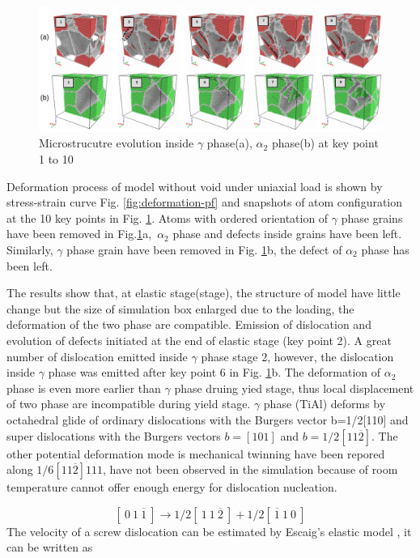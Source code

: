 \documentclass[metals,article,submit,moreauthors,pdftex,10pt,a4paper]{Definitions/mdpi}
\begin{document}
\begin{figure}[ht] 
	\centering
	\includegraphics[width=1\linewidth]{img/def2}
	\caption{Microstrucutre evolution inside $\gamma$ phase(a), $\alpha_2$ phase(b) at key point 1 to 10}
	\label{fig:Defect}
\end{figure}

Deformation process of model without void under uniaxial load is shown by stress-strain curve Fig. \ref{fig:deformation-pf} and snapshots of atom configuration at the 10 key points in Fig. \ref{fig:Defect}.  Atoms with ordered orientation  of $\gamma$ phase grains have been removed in Fig.\ref{fig:Defect}a,\ $\alpha_2$ phase and defects inside grains have been left. Similarly, $\gamma$ phase grain have been removed in Fig. \ref{fig:Defect}b, the defect of $\alpha_2$ phase has been left.  


The results show that, at elastic stage(stage\uppercase\expandafter{}), the structure of model have little change but the size of simulation box enlarged due to the loading, the deformation of the two phase are compatible. Emission of dislocation and evolution of defects initiated at the end of elastic stage (key point 2). A  great number of dislocation emitted inside $\gamma$ phase stage 2, however, the dislocation inside $\gamma$ phase was emitted after key point 6 in Fig. \ref{fig:Defect}b. The deformation of $\alpha_2$ phase is even more earlier than $\gamma$ phase druing yied stage, thus local displacement of two phase are incompatible during yield stage.  $\gamma$ phase (TiAl) deforms by octahedral glide of ordinary dislocations with the Burgers vector b=1/2[110] and super dislocations with the Burgers vectors $b=[101]$ and $b=1/2[11\overline{2}]$. The other potential deformation mode is mechanical twinning have been repored along $1/6[11\overline{2}]{111}$, have not been observed in the simulation because of room temperature cannot offer enough energy for dislocation nucleation.


\begin{equation}\label{eq:dis1}
	[\ 0\ 1\ \overline{1}\ ] \to 1/2 [\ 1\ 1\ \overline{2}\ ]+1/2[\ \overline{1}\ 1\ 0\ ]
\end{equation}
The velocity of a screw dislocation can be estimated by Escaig's elastic model \cite{Escaig1968}, it can be written as 
\end{document}
